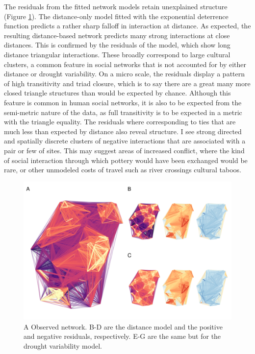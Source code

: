 \documentclass[11pt]{wlscirep}
\begin{document}
The residuals from the fitted network models retain unexplained structure (Figure \ref{fig:residuals}). The distance-only model fitted with the exponential deterrence function predicts a rather sharp falloff in interaction at distance. As expected, the resulting distance-based network predicts many strong interactions at close distances. This is confirmed by the residuals of the model, which show long distance triangular interactions. These broadly correspond to large cultural clusters, a common feature in social networks that is not accounted for by either distance or drought variability. On a micro scale, the residuals display a pattern of high transitivity and triad closure, which is to say there are a great many more closed triangle structures than would be expected by chance. Although this feature is common in human social networks, it is also to be expected from the semi-metric nature of the data, as full transitivity is to be expected in a metric with the triangle equality. The residuals where corresponding to ties that are much less than expected by distance also reveal structure. I see strong directed and spatially discrete clusters of negative interactions that are associated with a pair or few of sites. This may suggest areas of increased conflict, where the kind of social interaction through which pottery would have been exchanged would be rare, or other unmodeled costs of travel such as river crossings cultural taboos. 



\begin{figure}[!htbp]
\centering
\includegraphics[width=.8\linewidth]{figures/residuals.png}
\caption{A Observed network. B-D are the distance model and the positive and negative residuals, respectively. E-G are the same but for the drought variability model.}
\label{fig:residuals}
\end{figure}
\end{document}
